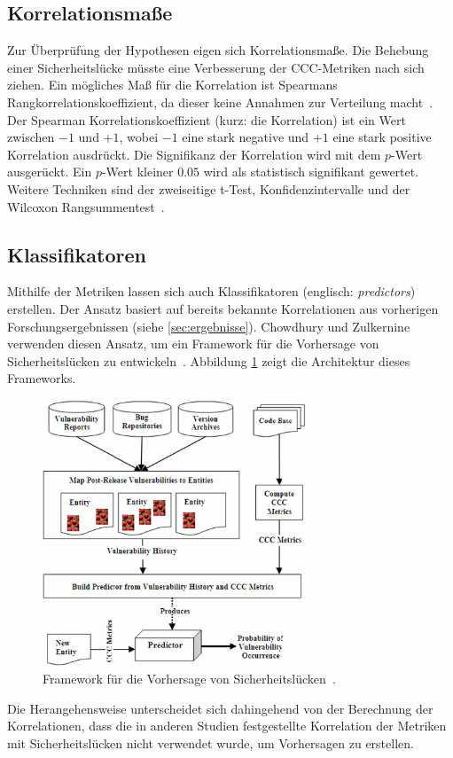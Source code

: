 \subsection{Korrelationsmaße}
Zur Überprüfung der Hypothesen eigen sich Korrelationsmaße.
Die Behebung einer Sicherheitslücke müsste eine Verbesserung der CCC-Metriken nach sich ziehen.
Ein mögliches Maß für die Korrelation ist Spearmans Rangkorrelationskoeffizient, da dieser keine Annahmen zur Verteilung macht~\cite{alves_et_al,chowdhury_zulkernine_2010}.
Der Spearman Korrelationskoeffizient (kurz: die Korrelation) ist ein Wert zwischen $-1$ und $+1$, wobei $-1$ eine stark negative und $+1$ eine stark positive Korrelation ausdrückt.
Die Signifikanz der Korrelation wird mit dem $p$-Wert ausgerückt.
Ein $p$-Wert kleiner $0.05$ wird als statistisch signifikant gewertet.
Weitere Techniken sind der zweiseitige t-Test, Konfidenzintervalle und der Wilcoxon Rangsummentest~\cite{alves_et_al}.

\subsection{Klassifikatoren}
Mithilfe der Metriken lassen sich auch Klassifikatoren (englisch: \emph{predictors}) erstellen.
Der Ansatz basiert auf bereits bekannte Korrelationen aus vorherigen Forschungsergebnissen (siehe \ref{sec:ergebnisse}).
Chowdhury und Zulkernine verwenden diesen Ansatz, um ein Framework für die Vorhersage von Sicherheitslücken zu entwickeln~\cite{chowdhury_zulkernine_2009}.
Abbildung \ref{fig:framework} zeigt die Architektur dieses Frameworks.
\begin{figure}
	\centering
	\includegraphics[width=0.7\textwidth]{img/framework.png}
	\caption{Framework für die Vorhersage von Sicherheitslücken~\cite{chowdhury_zulkernine_2009}.}
	\label{fig:framework}
\end{figure}
Die Herangehensweise unterscheidet sich dahingehend von der Berechnung der Korrelationen, dass die in anderen Studien festgestellte Korrelation der Metriken mit Sicherheitslücken nicht verwendet wurde, um Vorhersagen zu erstellen.

